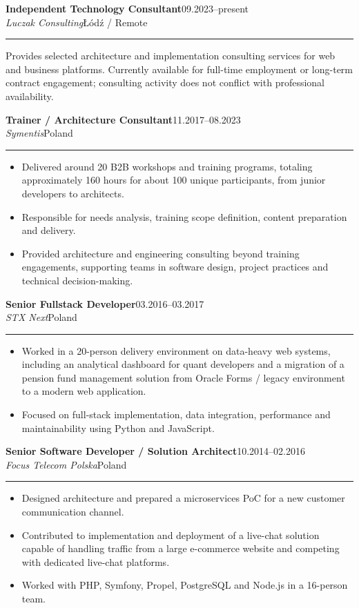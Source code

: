 \documentclass[10pt,a4paper]{article}
\newcommand{\role}[4]{%
  \Needspace{5\baselineskip}%
  \vspace{3pt}%
  {\bfseries\color{textmain}#1}\hfill {\small\color{textmuted}#2}\\[-1pt]
  {\itshape\color{accentdark}#3}\hfill {\small\color{textmuted}#4}\\[-4pt]
  {\color{linegray}\rule{\textwidth}{0.35pt}}\vspace{-3pt}
}
\begin{document}
\role{Independent Technology Consultant}{09.2023--present}{Luczak Consulting}{Łódź / Remote}
Provides selected architecture and implementation consulting services for web and business platforms. Currently available for full-time employment or long-term contract engagement; consulting activity does not conflict with professional availability.

\role{Trainer / Architecture Consultant}{11.2017--08.2023}{Symentis}{Poland}
\begin{itemize}
  \item Delivered around 20 B2B workshops and training programs, totaling approximately 160 hours for about 100 unique participants, from junior developers to architects.
  \item Responsible for needs analysis, training scope definition, content preparation and delivery.
  \item Provided architecture and engineering consulting beyond training engagements, supporting teams in software design, project practices and technical decision-making.
\end{itemize}

\role{Senior Fullstack Developer}{03.2016--03.2017}{STX Next}{Poland}
\begin{itemize}
  \item Worked in a 20-person delivery environment on data-heavy web systems, including an analytical dashboard for quant developers and a migration of a pension fund management solution from Oracle Forms / legacy environment to a modern web application.
  \item Focused on full-stack implementation, data integration, performance and maintainability using Python and JavaScript.
\end{itemize}

\role{Senior Software Developer / Solution Architect}{10.2014--02.2016}{Focus Telecom Polska}{Poland}
\begin{itemize}
  \item Designed architecture and prepared a microservices PoC for a new customer communication channel.
  \item Contributed to implementation and deployment of a live-chat solution capable of handling traffic from a large e-commerce website and competing with dedicated live-chat platforms.
  \item Worked with PHP, Symfony, Propel, PostgreSQL and Node.js in a 16-person team.
\end{itemize}
\end{document}
